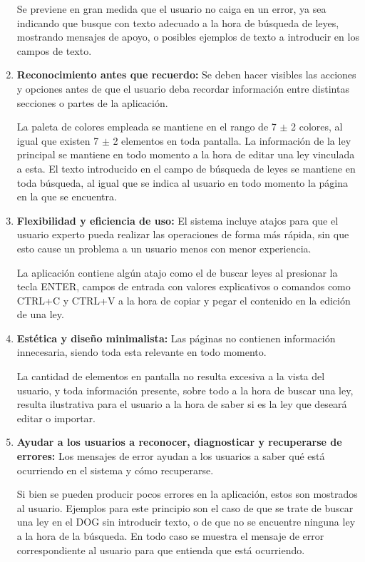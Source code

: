 \begin{enumerate}
    Se previene en gran medida que el usuario no caiga en un error, ya sea indicando que busque con texto adecuado a la hora de búsqueda de leyes, mostrando mensajes de apoyo, o posibles ejemplos de texto a introducir en los campos de texto.
    
    \item {\bf Reconocimiento antes que recuerdo:} Se deben hacer visibles las acciones y opciones antes de que el usuario deba recordar información entre distintas secciones o partes de la aplicación.
    
    
    La paleta de colores empleada se mantiene en el rango de 7 $\pm$ 2 colores, al igual que existen 7 $\pm$ 2 elementos en toda pantalla. La información de la ley principal se mantiene en todo momento a la hora de editar una ley vinculada a esta. El texto introducido en el campo de búsqueda de leyes se mantiene en toda búsqueda, al igual que se indica al usuario en todo momento la página en la que se encuentra.
    
    
    \item {\bf Flexibilidad y eficiencia de uso:} El sistema incluye atajos para que el usuario experto pueda realizar las operaciones de forma más rápida, sin que esto cause un problema a un usuario menos con menor experiencia.
    
    La aplicación contiene algún atajo como el de buscar leyes al presionar la tecla ENTER, campos de entrada con valores explicativos o comandos como CTRL+C y CTRL+V a la hora de copiar y pegar el contenido en la edición de una ley.
    
    
    \item {\bf Estética y diseño minimalista:} Las páginas no contienen información innecesaria, siendo toda esta relevante en todo momento.
    
    La cantidad de elementos en pantalla no resulta excesiva a la vista del usuario, y toda información presente, sobre todo a la hora de buscar una ley, resulta ilustrativa para el usuario a la hora de saber si es la ley que deseará editar o importar.
    
    
    \item {\bf Ayudar a los usuarios a reconocer, diagnosticar y recuperarse de errores:} Los mensajes de error ayudan a los usuarios a saber qué está ocurriendo en el sistema y cómo recuperarse.
    
    Si bien se pueden producir pocos errores en la aplicación, estos son mostrados al usuario. Ejemplos para este principio son el caso de que se trate de buscar una ley en el DOG sin introducir texto, o de que no se encuentre ninguna ley a la hora de la búsqueda. En todo caso se muestra el mensaje de error correspondiente al usuario para que entienda que está ocurriendo.
    

\end{enumerate}
